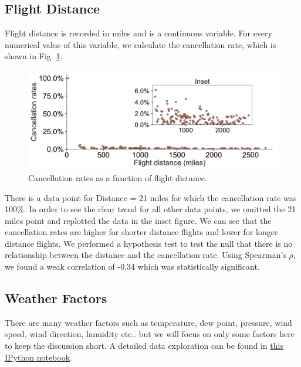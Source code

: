 \documentclass[12pt]{article}
\begin{document}
\subsection{Flight Distance}
\label{subsec:flightdistance}
Flight distance is recorded in miles and is a continuous variable. For every numerical value of this variable, we calculate the cancellation rate, which is shown in Fig. \ref{fig:distancecanrate}.   
\begin{figure}[h!]
\begin{center}
\includegraphics[width=6in]{distance_canrate.pdf}
\end{center}
\caption{\label{fig:distancecanrate}
Cancellation rates as a function of flight distance.}
\end{figure}
There is a data point for Distance = 21 miles for which the cancellation rate was 100$\%$. In order to see the clear trend for all other data points, we omitted the 21 miles point and replotted the data in the inset figure. We can see that the cancellation rates are higher for shorter distance flights and lower for longer distance flights. We performed a hypothesis test to test the null that there is no relationship between the distance and the cancellation rate. Using Spearman's $\rho$, we found a weak correlation of -0.34 which was statistically significant. 
\subsection{Weather Factors}
\label{subsec:weatherfactors}
There are many weather factors such as temperature, dew point, pressure, wind speed, wind direction, humidity etc.. but we will focus on only some factors here to keep the discussion short. A detailed data exploration can be found in \href{https://github.com/aajains/springboard-datascience-intensive/blob/master/capstone_project/EDA/ExploratoryDataAnalysis.ipynb}{this IPython notebook}. 
\end{document}
